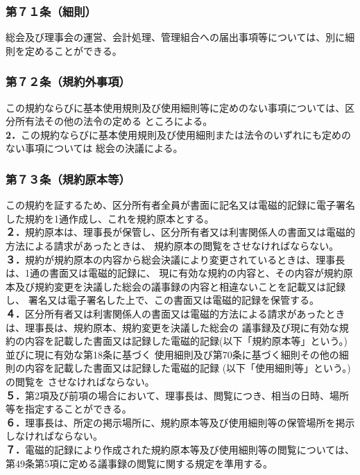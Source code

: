 \documentclass[
  luatex,
  paper=a4paper,
  fontsize=11pt,
  jafontsize=11pt,
  jlreq_notes,
]{jlreq}
\begin{document}
  \subsubsection*{第７１条（細則）}
  総会及び理事会の運営、会計処理、管理組合への届出事項等については、別に細則を定めることができる。
  \subsubsection*{第７２条（規約外事項）}
  この規約ならびに基本使用規則及び使用細則等に定めのない事項については、区分所有法その他の法令の定める
  ところによる。\\
  \textbf{2．}この規約ならびに基本使用規則及び使用細則または法令のいずれにも定めのない事項については
  総会の決議による。
  \subsubsection*{第７３条（規約原本等）}
  この規約を証するため、区分所有者全員が書面に記名又は電磁的記録に電子署名した規約を1通作成し、これを規約原本とする。\\
  \textbf{２．}規約原本は、理事長が保管し、区分所有者又は利害関係人の書面又は電磁的方法による請求があったときは、
  規約原本の閲覧をさせなければならない。\\
  \textbf{３．}規約が規約原本の内容から総会決議により変更されているときは、理事長は、1通の書面又は電磁的記録に、
  現に有効な規約の内容と、その内容が規約原本及び規約変更を決議した総会の議事録の内容と相違ないことを記載又は記録し、
  署名又は電子署名した上で、この書面又は電磁的記録を保管する。\\
  \textbf{４．}区分所有者又は利害関係人の書面又は電磁的方法による請求があったときは、理事長は、規約原本、規約変更を決議した総会の
  議事録及び現に有効な規約の内容を記載した書面又は記録した電磁的記録(以下「規約原本等」という。)並びに現に有効な第18条に基づく
  使用細則及び第70条に基づく細則その他の細則の内容を記載した書面又は記録した電磁的記録 (以下「使用細則等」という。)の閲覧を
  させなければならない。\\
  \textbf{５．}第2項及び前項の場合において、理事長は、閲覧につき、相当の日時、場所等を指定することができる。\\
  \textbf{６．}理事長は、所定の掲示場所に、規約原本等及び使用細則等の保管場所を掲示しなければならない。\\
  \textbf{７．}電磁的記録により作成された規約原本等及び使用細則等の閲覧については、第49条第5項に定める議事録の閲覧に関する規定を準用する。\\
  
\end{document}
